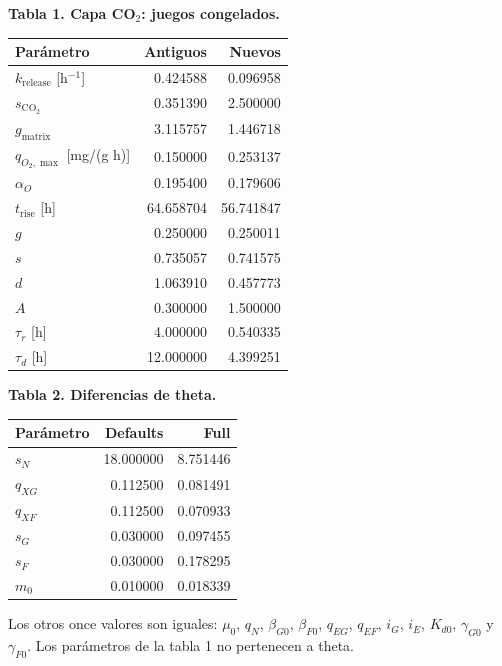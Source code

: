 \documentclass[10pt,a4paper]{article}
\begin{document}
\begin{center}
\begin{minipage}[t]{0.54\textwidth}
\centering\small
\textbf{Tabla 1. Capa CO\(_2\): juegos congelados.}\par\medskip
\begin{tabular}{@{}lrr@{}}
\toprule Parámetro & Antiguos & Nuevos\\\midrule
$k_{\mathrm{release}}$ [h$^{-1}$] & 0.424588 & 0.096958\\
$s_{\mathrm{CO_2}}$ & 0.351390 & 2.500000\\
$g_{\mathrm{matrix}}$ & 3.115757 & 1.446718\\
$q_{O_2,\max}$ [mg/(g h)] & 0.150000 & 0.253137\\
$\alpha_O$ & 0.195400 & 0.179606\\
$t_{\mathrm{rise}}$ [h] & 64.658704 & 56.741847\\
$g$ & 0.250000 & 0.250011\\
$s$ & 0.735057 & 0.741575\\
$d$ & 1.063910 & 0.457773\\
$A$ & 0.300000 & 1.500000\\
$\tau_r$ [h] & 4.000000 & 0.540335\\
$\tau_d$ [h] & 12.000000 & 4.399251\\
\bottomrule
\end{tabular}
\end{minipage}\hfill
\begin{minipage}[t]{0.43\textwidth}
\centering\small
\textbf{Tabla 2. Diferencias de theta.}\par\medskip
\begin{tabular}{@{}lrr@{}}
\toprule Parámetro & Defaults & Full\\\midrule
$s_N$ & 18.000000 & 8.751446\\
$q_{XG}$ & 0.112500 & 0.081491\\
$q_{XF}$ & 0.112500 & 0.070933\\
$s_G$ & 0.030000 & 0.097455\\
$s_F$ & 0.030000 & 0.178295\\
$m_0$ & 0.010000 & 0.018339\\
\bottomrule
\end{tabular}
\medskip\par\raggedright
Los otros once valores son iguales: $\mu_0$, $q_N$, $\beta_{G0}$,
$\beta_{F0}$, $q_{EG}$, $q_{EF}$, $i_G$, $i_E$, $K_{d0}$,
$\gamma_{G0}$ y $\gamma_{F0}$. Los parámetros de la tabla 1 no pertenecen
a theta.
\end{minipage}
\end{center}
\end{document}
